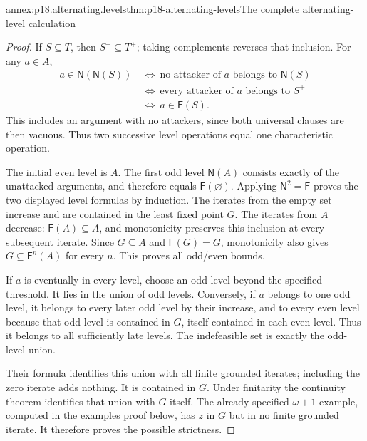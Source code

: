 \begin{annexitem}{annex:p18.alternating.levels}{thm:p18-alternating-levels}{The complete alternating-level calculation}
\begin{proof}
If \(S\subseteq T\), then \(S^+\subseteq T^+\);
taking complements reverses that inclusion.
For any \(a\in A\),
\[
\begin{aligned}
 a\in\mathsf N(\mathsf N(S))
 &\ \Longleftrightarrow\
       \text{no attacker of }a\text{ belongs to }\mathsf N(S)\\
 &\ \Longleftrightarrow\
       \text{every attacker of }a\text{ belongs to }S^+\\
 &\ \Longleftrightarrow\ a\in\mathsf F(S).
\end{aligned}
\]
This includes an argument with no attackers,
since both universal clauses are then vacuous.
Thus two successive level operations equal
one characteristic operation.

The initial even level is \(A\).
The first odd level \(\mathsf N(A)\)
consists exactly of the unattacked
arguments, and therefore equals
\(\mathsf F(\varnothing)\).
Applying \(\mathsf N^2=\mathsf F\)
proves the two displayed level
formulas by induction.
The iterates from the empty
set increase and are contained
in the least fixed point \(G\).
The iterates from \(A\) decrease:
\(\mathsf F(A)\subseteq A\),
and monotonicity preserves this
inclusion at every subsequent
iterate. Since \(G\subseteq A\)
and \(\mathsf F(G)=G\),
monotonicity also gives
\(G\subseteq\mathsf F^n(A)\)
for every \(n\). This proves
all odd/even bounds.

If \(a\) is eventually in
every level, choose an odd
level beyond the specified
threshold. It lies in the
union of odd levels.
Conversely, if \(a\) belongs
to one odd level, it
belongs to every later
odd level by their
increase, and to every
even level because that
odd level is contained
in \(G\), itself contained
in each even level.
Thus it belongs to
all sufficiently late
levels. The indefeasible
set is exactly the
odd-level union.

Their formula identifies
this union with all
finite grounded iterates;
including the zero
iterate adds nothing.
It is contained in
\(G\). Under finitarity
the continuity theorem
identifies that union
with \(G\) itself.
The already specified
\(\omega+1\) example,
computed in the examples
proof below, has \(z\)
in \(G\) but in no
finite grounded iterate.
It therefore proves
the possible strictness.
\end{proof}
\end{annexitem}

